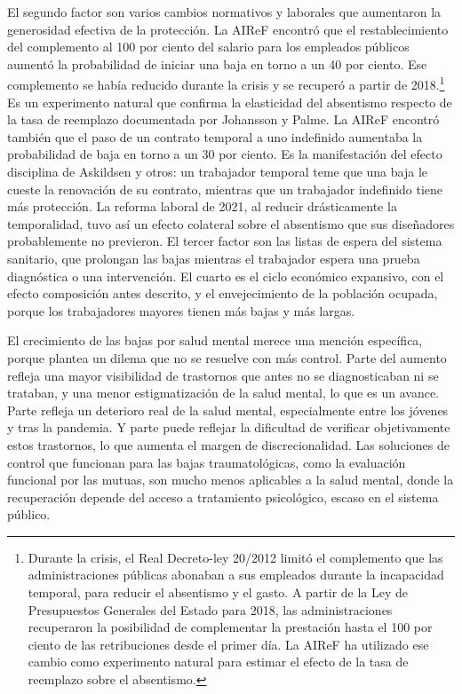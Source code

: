 \documentclass[10pt,a4paper]{article}
\begin{document}
El segundo factor son varios cambios normativos y laborales que aumentaron la generosidad efectiva de la protección. La AIReF encontró que el restablecimiento del complemento al 100 por ciento del salario para los empleados públicos aumentó la probabilidad de iniciar una baja en torno a un 40 por ciento. Ese complemento se había reducido durante la crisis y se recuperó a partir de 2018.\footnote{Durante la crisis, el Real Decreto-ley 20/2012 limitó el complemento que las administraciones públicas abonaban a sus empleados durante la incapacidad temporal, para reducir el absentismo y el gasto. A partir de la Ley de Presupuestos Generales del Estado para 2018, las administraciones recuperaron la posibilidad de complementar la prestación hasta el 100 por ciento de las retribuciones desde el primer día. La AIReF ha utilizado ese cambio como experimento natural para estimar el efecto de la tasa de reemplazo sobre el absentismo.
}
Es un experimento natural que confirma la elasticidad del absentismo respecto de la tasa de reemplazo documentada por Johansson y Palme. La AIReF encontró también que el paso de un contrato temporal a uno indefinido aumentaba la probabilidad de baja en torno a un 30 por ciento. Es la manifestación del efecto disciplina de Askildsen y otros: un trabajador temporal teme que una baja le cueste la renovación de su contrato, mientras que un trabajador indefinido tiene más protección. La reforma laboral de 2021, al reducir drásticamente la temporalidad, tuvo así un efecto colateral sobre el absentismo que sus diseñadores probablemente no previeron. El tercer factor son las listas de espera del sistema sanitario, que prolongan las bajas mientras el trabajador espera una prueba diagnóstica o una intervención. El cuarto es el ciclo económico expansivo, con el efecto composición antes descrito, y el envejecimiento de la población ocupada, porque los trabajadores mayores tienen más bajas y más largas.
    
El crecimiento de las bajas por salud mental merece una mención específica, porque plantea un dilema que no se resuelve con más control. Parte del aumento refleja una mayor visibilidad de trastornos que antes no se diagnosticaban ni se trataban, y una menor estigmatización de la salud mental, lo que es un avance. Parte refleja un deterioro real de la salud mental, especialmente entre los jóvenes y tras la pandemia. Y parte puede reflejar la dificultad de verificar objetivamente estos trastornos, lo que aumenta el margen de discrecionalidad. Las soluciones de control que funcionan para las bajas traumatológicas, como la evaluación funcional por las mutuas, son mucho menos aplicables a la salud mental, donde la recuperación depende del acceso a tratamiento psicológico, escaso en el sistema público.
\end{document}
